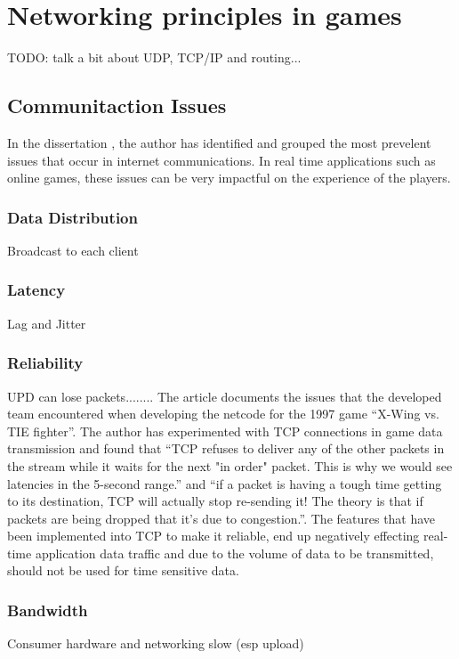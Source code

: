 \newpage
\section{Networking principles in games}
TODO: talk a bit about UDP, TCP/IP and routing...

\subsection{Communitaction Issues}

In the dissertation , the author has identified and grouped the most prevelent issues that occur in internet communications. In real time applications such as online games, these issues can be very impactful on the experience of the players.

\subsubsection{Data Distribution}
Broadcast to each client

\subsubsection{Latency}
Lag and Jitter

\subsubsection{Reliability}
UPD can lose packets........ The article  documents the issues that the developed team encountered when developing the netcode for the 1997 game ``X-Wing vs. TIE fighter''. The author has experimented with TCP connections in game data transmission and found that ``TCP refuses to deliver any of the other packets in the stream while it waits for the next "in order" packet. This is why we would see latencies in the 5-second range.'' and ``if a packet is having a tough time getting to its destination, TCP will actually stop re-sending it! The theory is that if packets are being dropped that it's due to congestion.''. The features that have been implemented into TCP to make it reliable, end up negatively effecting real-time application data traffic and due to the volume of data to be transmitted, should not be used for time sensitive data.

\subsubsection{Bandwidth}
Consumer hardware and networking slow (esp upload)



